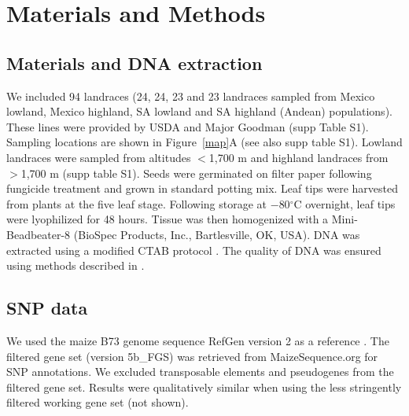 \section*{Materials and Methods}

\subsection*{Materials and DNA extraction}
We included 94 landraces (24, 24, 23 and 23 landraces sampled from Mexico lowland, Mexico highland, SA lowland and SA highland (Andean) populations).  These lines were provided by USDA and Major Goodman (supp Table S1).  Sampling locations are shown in Figure~\ref{map}A (see also supp table S1).   Lowland landraces were sampled from altitudes $<$1,700 m and highland landraces from  $>$1,700 m (supp table S1).    Seeds were germinated on filter paper following fungicide treatment and grown in standard potting mix.  Leaf tips were harvested from plants at the five leaf stage.  Following storage at $-80{}^\circ$C overnight, leaf tips were lyophilized for 48 hours.  Tissue was then homogenized with a Mini-Beadbeater-8 (BioSpec Products, Inc., Bartlesville, OK, USA).  DNA was extracted using a modified CTAB protocol \cite[]{CTAB}.  The quality of DNA was ensured using methods described in \cite{vanHeerwaarden_2011_21189301}.


\subsection*{SNP data}
We used the maize B73 genome sequence RefGen version 2 as a reference \cite[]{Schnable_2009_19965430}.  
The filtered gene set (version 5b\_FGS) was retrieved from MaizeSequence.org for SNP annotations.  
We excluded transposable elements and pseudogenes from the filtered gene set. 
Results were qualitatively similar when using the less stringently filtered working gene set (not shown).

